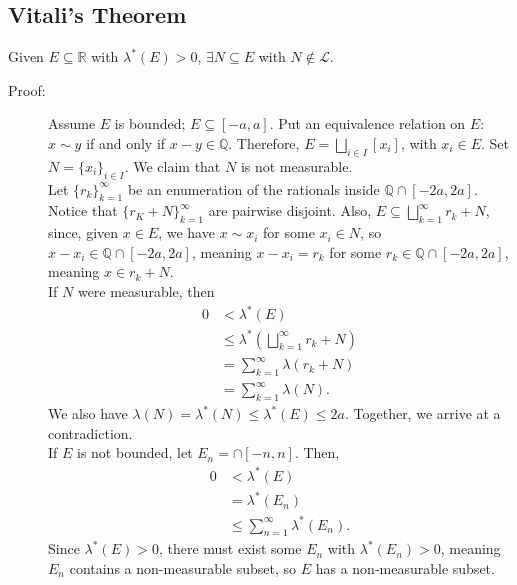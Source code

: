 \documentclass[10pt]{extarticle}
\newcommand{\Q}{\mathbb{Q}}
\newcommand{\R}{\mathbb{R}}
\begin{document}
  \subsection{Vitali's Theorem}%
  Given $E\subseteq \R$ with $\lambda^{\ast}(E) > 0$, $\exists N\subseteq E$ with $N\notin \mathcal{L}$.
  \begin{description}
    \item[Proof:] Assume $E$ is bounded; $E\subseteq [-a,a]$. Put an equivalence relation on $E$: $x\sim y$ if and only if $x-y\in\Q$. Therefore, $E = \bigsqcup_{i\in I}[x_i]$, with $x_i\in E$. Set $N = \{x_i\}_{i\in I}$. We claim that $N$ is not measurable.\\

      Let $\{r_k\}_{k=1}^{\infty}$ be an enumeration of the rationals inside $\Q\cap [-2a,2a]$. Notice that $\{r_K + N\}_{k=1}^{\infty}$ are pairwise disjoint. Also, $E\subseteq \bigsqcup_{k=1}^{\infty}r_k + N$, since, given $x\in E$, we have $x\sim x_i$ for some $x_i\in N$, so $x-x_i\in \Q\cap [-2a,2a]$, meaning $x-x_i=r_k$ for some $r_k\in \Q\cap [-2a,2a]$, meaning $x \in r_k + N$.\\

      If $N$ were measurable, then 
      \begin{align*}
        0 &< \lambda^{\ast}(E)\\
          &\leq \lambda^{\ast}\left(\bigsqcup_{k=1}^{\infty}r_k + N\right)\\
          &= \sum_{k=1}^{\infty} \lambda(r_k + N)\\
          &= \sum_{k=1}^{\infty}\lambda(N).
      \end{align*}
      We also have $\lambda(N) = \lambda^{\ast}(N) \leq \lambda^{\ast}(E) \leq 2a$. Together, we arrive at a contradiction.\\

      If $E$ is not bounded, let $E_n = \cap [-n,n]$. Then,
      \begin{align*}
        0 &< \lambda^{\ast}(E)\\
          &= \lambda^{\ast}(E_n)\\
          &\leq \sum_{n=1}^{\infty}\lambda^{\ast}(E_n).
      \end{align*}
      Since $\lambda^{\ast}(E) > 0$, there must exist some $E_n$ with $\lambda^{\ast}(E_n) > 0$, meaning $E_n$ contains a non-measurable subset, so $E$ has a non-measurable subset.
  \end{description}
\end{document}
